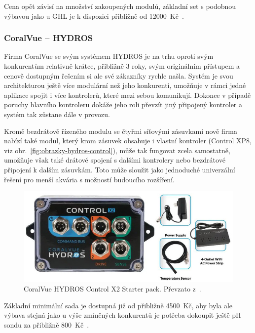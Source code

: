             Cena opět závisí na množství zakoupených modulů, základní set s podobnou výbavou jako u GHL je k dispozici přibližně od \qty{12000}{Kč}~\cite{neptune-systems-why-apex,eshop-neptune-systems-apex}.

        \subsubsection{CoralVue -- HYDROS}
            Firma CoralVue se svým systémem HYDROS je na trhu oproti svým konkurentům relativně krátce, přibližně 3 roky, svým originálním přístupem a cenově dostupným řešením si ale své zákazníky rychle našla. Systém je svou architekturou ještě více modulární než jeho konkurenti, umožňuje v rámci jedné aplikace spojit i více kontrolerů, které mezi sebou komunikují. Dokonce v případě poruchy hlavního kontroleru dokáže jeho roli převzít jiný připojený kontroler a systém tak zůstane dále v provozu. 
            
            Kromě bezdrátově řízeného modulu se čtyřmi síťovými zásuvkami nově firma nabízí také modul, který krom zásuvek obsahuje i vlastní kontroler (Control XP8, viz obr.~\ref{fig:obrazky-hydros-control}), může tak fungovat zcela samostatně, umožňuje však také drátové spojení s dalšími kontrolery nebo bezdrátové připojení k dalším zásuvkám. Toto může sloužit jako jednoduché univerzální řešení pro menší akvária s možností budoucího rozšíření. 

            \begin{figure}[h!]
                \centering
                \includegraphics[width=\textwidth]{obrazky/trh/hydros-x2-starter-pack.jpg}
                \caption{CoralVue HYDROS Control X2 Starter pack. Převzato z~\cite{eshop-coralvue-hydros}.}
                \label{fig:obrazky-trh-hydros-x2-starter-pack-jpg}
            \end{figure}
            
            Základní minimální sada je dostupná již od přibližně \qty{4500}{Kč}, aby byla ale výbava stejná jako u výše zmíněných konkurentů je potřeba dokoupit ještě pH sondu za přibližně \qty{800}{Kč}~\cite{coralvuehydros,eshop-coralvue-hydros}.
            
